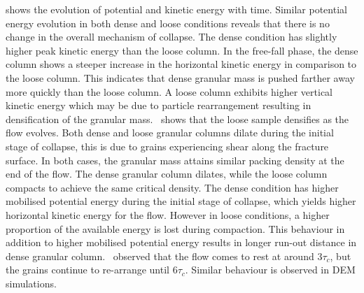  shows the evolution of potential and kinetic 
energy with time. Similar potential energy evolution in both dense and loose 
conditions reveals that there is no change in the overall mechanism of 
collapse. The dense condition has slightly higher peak kinetic energy than the 
loose column. In the free-fall phase, the dense column shows a steeper increase 
in the horizontal kinetic energy in comparison to the loose column. This 
indicates that dense granular mass is pushed farther away more quickly than the 
loose column. A loose column exhibits higher vertical kinetic energy which may 
be due to particle rearrangement resulting in densification of the granular 
mass.~ shows that the loose sample densifies as the flow 
evolves. Both dense and loose granular columns dilate during the initial stage 
of collapse, this is due to grains experiencing shear along the fracture 
surface. In both cases, the granular mass attains similar packing density at 
the end of the flow. The dense granular column dilates, while the loose column 
compacts to achieve the same critical density. The dense condition has higher 
mobilised potential energy during the initial stage of collapse, which 
yields higher horizontal kinetic energy for the flow. However in loose 
conditions, a higher proportion of the available energy is lost during 
compaction. This behaviour in addition to higher mobilised potential energy 
results in longer run-out distance in dense granular 
column.~\citet{Lajeunesse2004} observed that the flow comes to rest at around 
$3\tau_c$, but the grains continue to re-arrange until $6\tau_c$. Similar 
behaviour is observed in DEM simulations.

